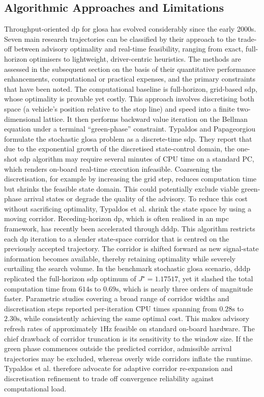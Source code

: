 \subsection{Algorithmic Approaches and Limitations}
\label{subsec:flow_dp_algorithms_limitations}

Throughput-oriented \ac{dp} for \ac{glosa} has evolved considerably since the early 2000s. Seven main research trajectories can be classified by their approach to the trade-off between advisory optimality and real-time feasibility, ranging from exact, full-horizon optimisers to lightweight, driver-centric heuristics. The methods are assessed in the subsequent section on the basis of their quantitative performance enhancements, computational or practical expenses, and the primary constraints that have been noted.
\mynewline
The computational baseline is full-horizon, grid-based \ac{sdp}, whose optimality is provable yet costly. This approach involves discretising both space (a vehicle's position relative to the stop line) and speed into a finite two-dimensional lattice. It then performs backward value iteration on the Bellman equation under a terminal \enquote{green-phase} constraint. Typaldos and Papageorgiou \cite{Typaldos2021} formulate the stochastic \ac{glosa} problem as a discrete-time \ac{sdp}. They report that due to the exponential growth of the discretised state-control domain, the one-shot \ac{sdp} algorithm may require several minutes of CPU time on a standard PC, which renders on-board real-time execution infeasible. Coarsening the discretisation, for example by increasing the grid step, reduces computation time but shrinks the feasible state domain. This could potentially exclude viable green-phase arrival states or degrade the quality of the advisory.
\mynewline
To reduce this cost without sacrificing optimality, Typaldos et al. \cite{Typaldos2023} shrink the state space by using a moving corridor. Receding-horizon \ac{dp}, which is often realised in an \ac{mpc} framework, has recently been accelerated through \ac{dddp}. This algorithm restricts each \ac{dp} iteration to a slender state-space corridor that is centred on the previously accepted trajectory. The corridor is shifted forward as new signal-state information becomes available, thereby retaining optimality while severely curtailing the search volume. In the benchmark stochastic \ac{glosa} scenario, \ac{dddp} replicated the full-horizon \ac{sdp} optimum of $J^\star=1.17517$, yet it slashed the total computation time from $614\unit{\second}$ to $0.69\unit{\second}$, which is nearly three orders of magnitude faster. Parametric studies covering a broad range of corridor widths and discretisation steps reported per-iteration CPU times spanning from $0.28\unit{\second}$ to $2.30\unit{\second}$, while consistently achieving the same optimal cost. This makes advisory refresh rates of approximately $1\unit{\hertz}$ feasible on standard on-board hardware. The chief drawback of corridor truncation is its sensitivity to the window size. If the green phase commences outside the predicted corridor, admissible arrival trajectories may be excluded, whereas overly wide corridors inflate the runtime. Typaldos et al. therefore advocate for adaptive corridor re-expansion and discretisation refinement to trade off convergence reliability against computational load.
